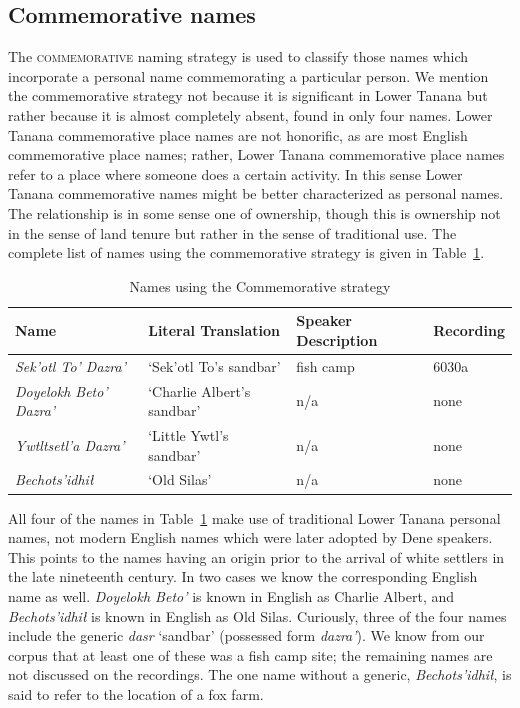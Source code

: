 \subsection{Commemorative names}
The \textsc{commemorative} naming strategy is used to classify those names which incorporate a personal name commemorating a particular person. We mention the commemorative strategy not because it is significant in Lower Tanana but rather because it is almost completely absent, found in only four names. Lower Tanana commemorative place names are not honorific, as are most English commemorative place names; rather, Lower Tanana commemorative place names refer to a place where someone does a certain activity. In this sense Lower Tanana commemorative names might be better characterized as personal names. The relationship is in some sense one of ownership, though this is ownership not in the sense of land tenure but rather in the sense of traditional use. The complete list of names using the commemorative strategy is given in Table~\ref{holton:tab:commemorative}.


\begin{table}
\caption{Names using the Commemorative strategy}
\label{holton:tab:commemorative}
\begin{tabular}{l | l | l | l} 
\small
{\bfseries Name} &
{\bfseries Literal Translation} &
{\bfseries Speaker Description} &
{\bfseries Recording}\\\hline

\textit{Sek’otl To’ Dazra’} &
‘Sek’otl To’s sandbar’ &
fish camp &
6030a\\
\textit{Doyelokh Beto’ Dazra’} &
‘Charlie Albert’s sandbar’ &
n/a &
none\\
\textit{Ywtltsetl’a Dazra’} &
‘Little Ywtl’s sandbar’ &
n/a &
none\\
 \textit{Bechots’idhił} &
‘Old Silas’ &
n/a &
none\\
\end{tabular}
\end{table}

All four of the names in Table~\ref{holton:tab:commemorative} make use of traditional Lower Tanana personal names, not modern English names which were later adopted by Dene speakers. This points to the names having an origin prior to the arrival of white settlers in the late nineteenth century. In two cases we know the corresponding English name as well. \textit{Doyelokh Beto’} is known in English as Charlie Albert, and \textit{Bechots’idhił} is known in English as Old Silas. Curiously, three of the four names include the generic \textit{dasr} ‘sandbar’ (possessed form \textit{dazra’}). We know from our corpus that at least one of these was a fish camp site; the remaining names are not discussed on the recordings. The one name without a generic, \textit{Bechots’idhił}, is said to refer to the location of a fox farm.

